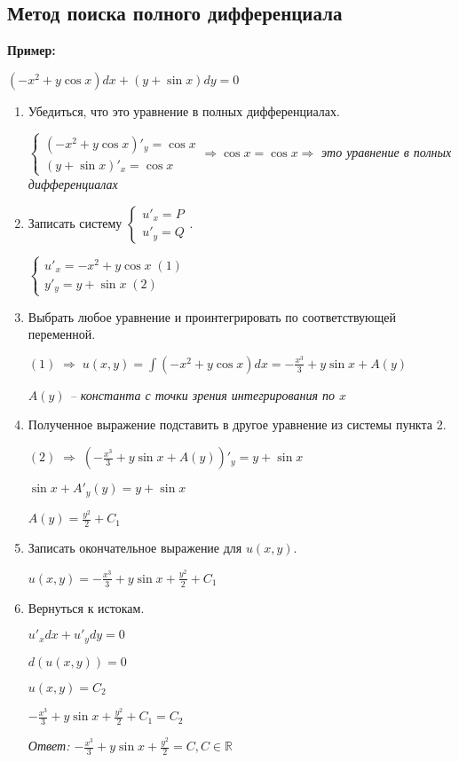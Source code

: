 \documentclass[10pt, a4paper]{article}
\begin{document}
\subsection{Метод поиска полного дифференциала}
\textbf{Пример:}
\par $(-x^2 + y\cos{x})dx + (y + \sin{x})dy = 0$
\begin{enumerate}
    \item Убедиться, что это уравнение в полных дифференциалах.
        \par
            $\begin{cases}
                (-x^2 + y\cos{x})'_y = \cos{x} \\
                (y + \sin{x})'_x = \cos{x}
            \end{cases}
            \Rightarrow
            \cos{x} = \cos{x}
            \Rightarrow$
            \textit{это уравнение в полных дифференциалах}
    \item Записать систему $\begin{cases}
                               u'_x = P \\
                               u'_y = Q
                            \end{cases}$.
        \par
            $\begin{cases}
                u'_x = -x^2 + y\cos{x}\;(1) \\
                y'_y = y + \sin{x}\;(2)
            \end{cases}$
    \item Выбрать любое уравнение и проинтегрировать по соответствующей переменной.
        \par $(1)\;\Rightarrow\;u(x, y) = \int{(-x^2 +y\cos{x})}dx = -\frac{x^3}{3} + y\sin{x} + A(y)$
        \par \textit{$A(y)$ -- константа с точки зрения интегрирования по $x$}
    \item Полученное выражение подставить в другое уравнение из системы пункта 2.
        \par $(2)\;\Rightarrow\;(-\frac{x^3}{3} + y\sin{x} + A(y))'_y = y + \sin{x}$
        \par $\sin{x} + A'_y(y) = y + \sin{x}$
        \par $A(y) = \frac{y^2}{2} + C_1$
    \item Записать окончательное выражение для $u(x, y)$.
        \par $u(x, y) = -\frac{x^3}{3} + y\sin{x} + \frac{y^2}{2} + C_1$
    \item Вернуться к истокам.
        \par $u'_xdx + u'_ydy = 0$
        \par $d(u(x, y)) = 0$
        \par $u(x, y) = C_2$
        \par $-\frac{x^3}{3} + y\sin{x} + \frac{y^2}{2} + C_1 = C_2$
        \par\textit{Ответ: $-\frac{x^3}{3} + y\sin{x} + \frac{y^2}{2} = C, C \in \mathbb{R}$}
\end{enumerate}
\end{document}
